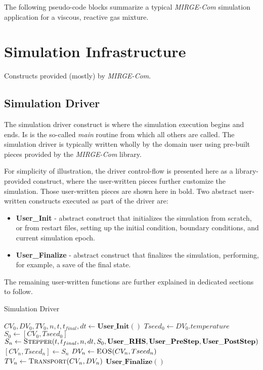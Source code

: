 \documentclass{article}
\begin{document}
The following pseudo-code blocks summarize a typical \textit{MIRGE-Com} simulation application for a viscous, reactive gas mixture.

\section{Simulation Infrastructure}
Constructs provided (mostly) by \textit{MIRGE-Com}.

\subsection{Simulation Driver}
The simulation driver construct is where the simulation execution begins and ends. Is is the so-called \textit{main} routine from which all others are called.  The simulation driver is typically written wholly by the domain user using pre-built pieces provided by the \textit{MIRGE-Com} library.

For simplicity of illustration, the driver control-flow is presented here as a library-provided construct, where the user-written pieces further customize the simulation. Those user-written pieces are shown here in bold.  Two abstract user-written constructs executed as part of the driver are:
\begin{itemize}
\item \textbf{User\_Init} - abstract construct that initializes the simulation from scratch, or from restart files, setting up the initial condition, boundary conditions, and current simulation epoch.
\item \textbf{User\_Finalize} - abstract construct that finalizes the simulation, performing, for example, a save of the final state.
\end{itemize}

The remaining user-written functions are further explained in dedicated sections to follow.

\begin{algorithm}
  \caption{Simulation Driver}
  \begin{algorithmic}[1]
    \State $CV_0, DV_0, TV_0, n, t, t_{final}, dt \gets \mathbf{User\_Init()}$ 
    \State $Tseed_0 \gets DV_0.{temperature}$
    \State $S_0 \gets [CV_0, Tseed_0]$
    \State $S_n \gets \Call{Stepper}{t, t_{final}, n, dt, S_0, \mathbf{User\_RHS}, \mathbf{User\_PreStep}, \mathbf{User\_PostStep}}$
    \State $[CV_n, Tseed_n] \gets S_n$
    \State $DV_n \gets \Call{EOS}{CV_n, Tseed_n}$
    \State $TV_n \gets \Call{Transport}{CV_n, DV_n}$
    \State $\mathbf{User\_Finalize()}$
  \end{algorithmic}
\end{algorithm}
\end{document}
